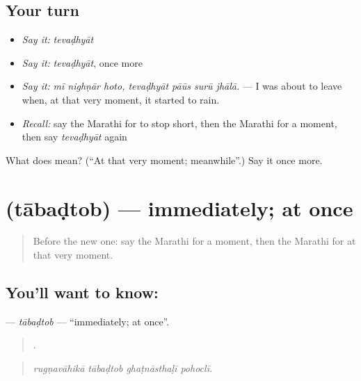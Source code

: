 \subsection*{Your turn}
\begin{itemize}
\raggedright
  \item \emph{Say it:} \emph{tevaḍhyāt}
  \item \emph{Say it:} \emph{tevaḍhyāt}, once more
  \item \emph{Say it:} \emph{mī nighṇār hoto, tevaḍhyāt pāūs surū jhālā.} — I was about to leave when, at that very moment, it started to rain.
  \item \emph{Recall:} say the Marathi for to stop short, then the Marathi for a moment, then say \emph{tevaḍhyāt} again
\end{itemize}

\begin{tcolorbox}[breakable,colback=teal!4,colframe=teal!35!black,title={Before you move on}]
What does  mean? (\textquotedblleft{}At that very moment; meanwhile\textquotedblright{}.) Say it once more.
\end{tcolorbox}
\section[\texorpdfstring{\mr{ताबडतोब} (tābaḍtob)}{ताबडतोब (tābaḍtob)}]{ (tābaḍtob) — immediately; at once}

\label{lesson:MR-C302-tabadtob}



\begin{quote}
Before the new one: say the Marathi for a moment, then the Marathi for at that very moment.
\end{quote}

\subsection*{You'll want to know: }
\textbf{} — \emph{tābaḍtob} — \textquotedblleft{}immediately; at once\textquotedblright{}.

\begin{quote}
   .
\end{quote}

\begin{quote}
\emph{rugṇavāhikā tābaḍtob ghaṭnāsthaḷī pohoclī.}
\end{quote}

